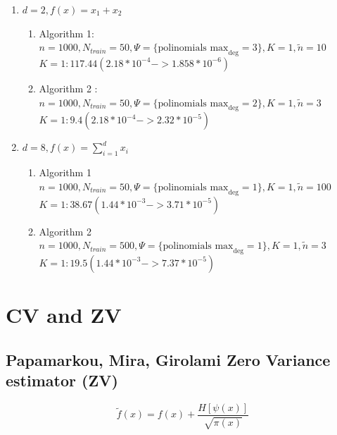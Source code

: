 \documentclass[a4paper]{article}
\begin{document}
\begin{enumerate}
    \item $d =2, f(x) = x_1 + x_2$
    \begin{enumerate}
    \item Algorithm 1: $n = 1000,N_{train} = 50, \Psi = \{\text{polinomials max}_\text{deg} = 3\}, K =1, \tilde{n} = 10$\\
    $K = 1: 117.44 ( 2.18 * 10^{-4} -> 1.858 * 10^{-6} )$\\

    
    \item Algorithm 2 :$n = 1000,N_{train} = 50, \Psi = \{\text{polinomials max}_\text{deg} = 2\}, K =1, \tilde{n} = 3$\\
    $K = 1 : 9.4 (2.18 * 10^{-4} -> 2.32 * 10^{-5})$\\
    
    \end{enumerate}
    \item $d =8, f(x) = \sum_{i=1}^d x_i$
    \begin{enumerate}
        
    \item Algorithm 1 $n = 1000,N_{train} = 50, \Psi = \{\text{polinomials max}_\text{deg} = 1\}, K =1, \tilde{n} = 100$\\
    $K = 1 : 38.67  ( 1.44 * 10^{-3} -> 3.71 * 10^{-5})$
    
    \item Algorithm 2 $n = 1000,N_{train} = 500, \Psi = \{\text{polinomials max}_\text{deg} = 1\}, K =1, \tilde{n} = 3$\\
    $K = 1 : 19.5 ( 1.44 * 10^{-3} -> 7.37 * 10^{-5})$
    \end{enumerate}
\end{enumerate}












\section{CV and ZV}

\subsection{Papamarkou, Mira, Girolami Zero Variance estimator (ZV)}

$$\tilde{f}(x) = f(x) + \frac{H \left[\psi(x) \right]}{\sqrt{\pi(x)}}$$
\end{document}
